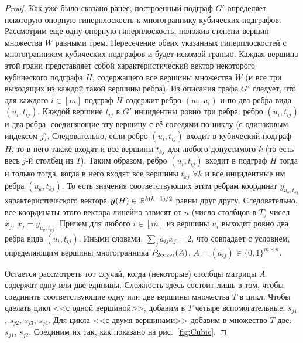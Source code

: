\begin{proof}
Как уже было сказано ранее, построенный подграф $G'$ определяет некоторую опорную гиперплоскость к многограннику кубических подграфов.
Рассмотрим еще одну опорную гиперплоскость, положив степени вершин множества $W$ равными трем.
Пересечение обеих указанных гиперплоскостей с многогранником кубических подграфов и будет искомой гранью.
Каждая вершина этой грани представляет собой характеристический вектор некоторого кубического подграфа $H$, содержащего все вершины множества $W$ (и все три выходящих из каждой такой вершины ребра). Из описания графа $G'$ следует, что для каждого $i \in [m]$ подграф $H$ содержит ребро $(w_i, u_i)$ и по два ребра вида $(u_i, t_{ij})$. Каждой вершине $t_{ij}$ в $G'$ инцидентны ровно три ребра: ребро $(u_i, t_{ij})$ и два ребра, соединяющие эту вершину с её соседями по циклу (с одинаковым индексом $j$). Следовательно, если ребро $(u_i, t_{ij})$ входит в кубический подграф $H$, то в него также входят и все вершины $t_{kj}$ для любого допустимого $k$ (то есть весь $j$-й столбец из $T$). Таким образом, ребро $(u_i, t_{ij})$ входит в подграф $H$ тогда и только тогда, когда в него входят все вершины $t_{kj}$ $\forall k$ и все инцидентные им ребра $(u_k, t_{kj})$. То есть значения соответствующих этим ребрам координат $y_{u_k, t_{kj}}$ характеристического вектора $\bm{y}(H)\in\mathbb{R}^{k(k-1)/2}$ равны друг другу. Следовательно, все координаты этого вектора линейно зависят от $n$ (число столбцов в $T$) чисел $x_j$, $x_j = y_{u_k, t_{kj}}$. Причем для любого $i \in [m]$ из вершины $u_i$ выходит ровно два ребра вида $(u_i, t_{ij})$. Иными словами, $\sum_j a_{ij} x_j = 2$, что совпадает с условием, определяющим вершины многогранника $P_{\textup{2cover}}(A)$, $A = (a_{ij})\in \{0,1\}^{m\times n}$.

	
Остается рассмотреть тот случай, когда (некоторые) столбцы матрицы $A$ содержат одну или две единицы.
Сложность здесь состоит лишь в том, чтобы соединить соответствующие одну или две вершины множества $T$ в цикл.
Чтобы сделать цикл <<с одной вершиной>>, добавим в $T$ четыре вспомогательные: 
$s_{j1}$, $s_{j2}$, $s_{j3}$, $s_{j4}$.
Для цикла <<с двумя вершинами>> добавим	в множество $T$ две: $s_{j1}$, $s_{j2}$.
Соединим их так, как показано на рис.~\ref{fig:Cubic}.
	

\end{proof}
